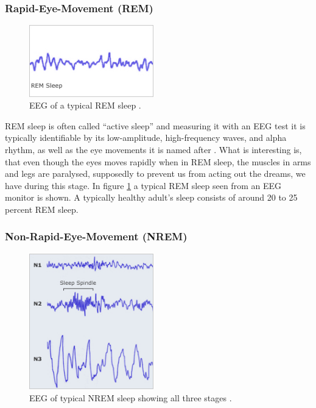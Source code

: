 \documentclass[12pt]{article} %
\begin{document}
\subsubsection{Rapid-Eye-Movement (REM)}
\begin{figure}
  \begin{center}
    \includegraphics[width=0.48\textwidth]{img/rem}
  \end{center}
    \vspace{-20pt}
  \caption{EEG of a typical REM sleep \cite{harvard}.}
  \label{fig:rem}
\end{figure}

REM sleep is often called ``active sleep'' and measuring it with an EEG test it is typically identifiable by its low-amplitude, high-frequency waves, and alpha rhythm, as well as the eye movements it is named after \cite{harvard}. What is interesting is, that even though the eyes moves rapidly when in REM sleep, the muscles in arms and legs are paralysed, supposedly to prevent us from acting out the dreams, we have during this stage. In figure \ref{fig:rem} a typical REM sleep seen from an EEG monitor is shown. A typically healthy adult's sleep consists of around 20 to 25 percent REM sleep. 

\subsubsection{Non-Rapid-Eye-Movement (NREM)}
\begin{figure}
  \vspace{-25pt}
  \begin{center}
    \includegraphics[width=0.48\textwidth]{img/nrem}
  \end{center}
    \vspace{-20pt}
  \caption{EEG of typical NREM sleep showing all three stages \cite{harvard}.}
        \vspace{-20pt}
  \label{fig:nrem}
\end{figure}
\end{document}
